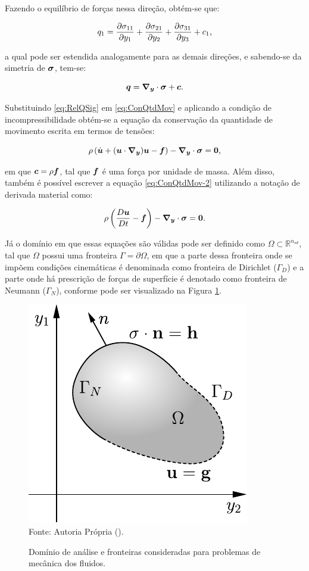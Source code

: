 Fazendo o equilíbrio de forças nessa direção, obtém-se que:

\begin{equation}
    q_1=\frac{\partial{\sigma_{11}}}{\partial{y_1}}+\frac{\partial{\sigma_{21}}}{\partial{y_2}}+\frac{\partial{\sigma_{31}}}{\partial{y_3}}+c_1\text{,}
\end{equation}

\noindent a qual pode ser estendida analogamente para as demais direções, e sabendo-se da simetria de $\boldsymbol{\sigma}$, tem-se:

\begin{equation}
    \boldsymbol{q}=\boldsymbol{\nabla_y}\cdot\boldsymbol{\sigma}+\boldsymbol{c}\text{.}
    \label{eq:RelQSig}
\end{equation}

Substituindo \eqref{eq:RelQSig} em \eqref{eq:ConQtdMov} e aplicando a condição de incompressibilidade obtém-se a equação da conservação da quantidade de movimento escrita em termos de tensões:

\begin{equation}
    \rho\left({\dot{\boldsymbol{u}}+(\boldsymbol{u}\cdot\boldsymbol{\nabla_y})\boldsymbol{u}-\boldsymbol{f}}\right)-\boldsymbol{\nabla_y}\cdot\boldsymbol{\sigma}=\boldsymbol{0}\text{,}
    \label{eq:ConQtdMov-2}
\end{equation}

\noindent em que $\boldsymbol{c}=\rho\boldsymbol{f}$, tal que $\boldsymbol{f}$ é uma força por unidade de massa. Além disso, também é possível escrever a equação \eqref{eq:ConQtdMov-2} utilizando a notação de derivada material como:

\begin{equation}
    \rho\left({\frac{D\boldsymbol{u}}{Dt}-\boldsymbol{f}}\right)-\boldsymbol{\nabla_y}\cdot\boldsymbol{\sigma}=\boldsymbol{0}\text{.}
    \label{eq:ConQtdMov-3}
\end{equation}

Já o domínio em que essas equações são válidas pode ser definido como $\Omega\subset\mathbb{R}^{n_{sd}}$, tal que $\Omega$ possui uma fronteira $\Gamma=\partial\Omega$, em que a parte dessa fronteira onde se impõem condições cinemáticas é denominada como fronteira de Dirichlet ($\Gamma_D$) e a parte onde há prescrição de forças de superfície é denotado como fronteira de Neumann ($\Gamma_N$), conforme pode ser visualizado na Figura \ref{fig:Dom}.

\begin{figure}[h!]
    \centering
    \caption{Domínio de análise e fronteiras consideradas para problemas de mecânica dos fluidos.}
    \includegraphics[width=.35\linewidth]{Figuras/Dom}
    \\Fonte: Autoria Própria (\the\year).
    \label{fig:Dom}
\end{figure}

